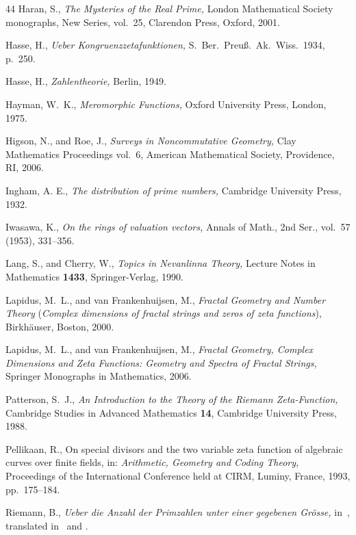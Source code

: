 \documentclass{amsart}
\theoremstyle{definition}\newtheorem{definition}[theorem]{Definition}
\theoremstyle{remark}\newtheorem{remark}[theorem]{Remark}
\numberwithin{equation}{section}
\begin{document}
\begin{thebibliography}{44}
	Haran, S.,
{\em The Mysteries of the Real Prime,\/} London Mathematical Society monographs, New Series, vol.~25, Clarendon Press, Oxford, 2001.

	Hasse, H.,
{\em Ueber Kongruenzzetafunktionen,\/} S.\ Ber.\ Preu\ss.\ Ak.\ Wiss.\ 1934, p.~250.

	Hasse, H.,
{\em Zahlentheorie,\/} Berlin, 1949.

	Hayman, W.\ K.,
{\em Meromorphic Functions,\/}
Oxford University Press, London, 1975.

	Higson, N., and Roe, J.,
\textit{Surveys in Noncommutative Geometry,\/}
Clay Mathematics Proceedings vol.~6, American Mathematical Society, Providence, RI, 2006.

	Ingham, A. E.,
{\em The distribution of prime numbers,\/}
Cambridge University Press, 1932.

	Iwasawa, K.,
{\em On the rings of valuation vectors,\/}
Annals of Math., 2nd Ser., vol.~57 (1953), 331--356.

	Lang, S., and Cherry, W.,
\textit{Topics in Nevanlinna Theory,\/}
Lecture Notes in Mathematics \textbf{1433}, Springer-Verlag, 1990.

	Lapidus, M.\ L., and van Frankenhuijsen, M.,
\textit{Fractal Geometry and Number Theory} (\textit{Complex dimensions of fractal strings and zeros of zeta functions}),
Birkh\"auser, Boston, 2000.

	Lapidus, M.\ L., and van Frankenhuijsen, M.,
\textit{Fractal Geometry, Complex Dimensions and Zeta Functions: Geometry and Spectra of Fractal Strings,}
Springer Monographs in Mathematics, 2006.

	Patterson, S.\ J.,
\textit{An Introduction to the Theory of the Riemann Zeta-Function,}
Cambridge Studies in Advanced Mathematics \textbf{14}, Cambridge University Press, 1988.

	Pellikaan, R.,
On special divisors and the two variable zeta function of algebraic curves over	finite fields, 
in: \textit{Arithmetic, Geometry and Coding Theory,}
Proceedings of the International Conference held at CIRM, Luminy, France, 1993, pp.\ 175--184.

	Riemann, B.,
{\em Ueber die Anzahl der Primzahlen unter einer gegebenen Gr\"osse,\/}
in~\cite[p.~145]{Riemann}, translated in~\cite[p.~299]{Edwards} and \cite{RiemannT}.


\end{thebibliography}
\end{document}
